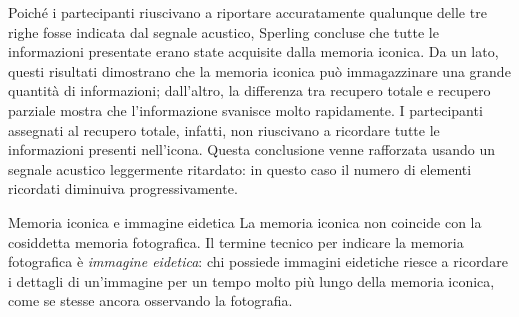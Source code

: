 \documentclass[a4paper]{article}
\begin{document}
Poiché i partecipanti riuscivano a riportare accuratamente qualunque delle tre righe fosse indicata dal segnale acustico, Sperling concluse che tutte le informazioni presentate erano state acquisite dalla memoria iconica.
Da un lato, questi risultati dimostrano che la memoria iconica può immagazzinare una grande quantità di informazioni; dall'altro, la differenza tra recupero totale e recupero parziale mostra che l'informazione svanisce molto rapidamente. I partecipanti assegnati al recupero totale, infatti, non riuscivano a ricordare tutte le informazioni presenti nell'icona.
Questa conclusione venne rafforzata usando un segnale acustico leggermente ritardato: in questo caso il numero di elementi ricordati diminuiva progressivamente.
\begin{snippetnote}{Memoria iconica e immagine eidetica}
    La memoria iconica non coincide con la cosiddetta memoria fotografica. Il termine tecnico per indicare la memoria fotografica è \emph{immagine eidetica}: chi possiede immagini eidetiche riesce a ricordare i dettagli di un'immagine per un tempo molto più lungo della memoria iconica, come se stesse ancora osservando la fotografia.
\end{snippetnote}
\end{document}
